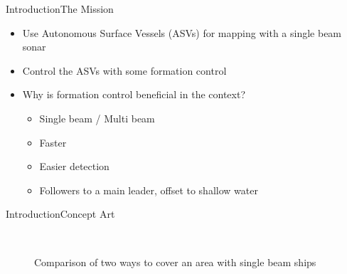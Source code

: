 \documentclass[10pt,handout]{beamer}
\begin{document}
\begin{frame}{Introduction}{The Mission}
\begin{itemize}
\item Use Autonomous Surface Vessels (ASVs) for mapping with a single beam sonar
\item Control the ASVs with some formation control
\item Why is formation control beneficial in the context?
\begin{itemize}
\item Single beam / Multi beam
\item Faster
\item Easier detection
\item Followers to a main leader, offset to shallow water
\end{itemize}
\end{itemize}
\end{frame}

\begin{frame}{Introduction}{Concept Art}
\begin{figure}
  \centering
  \ %
  \caption{Comparison of two ways to cover an area with single beam ships}
  \label{fig:concept-art}
\end{figure}
\end{frame}
\end{document}
